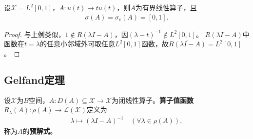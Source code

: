 \documentclass[../../main.tex]{subfiles}%
\begin{document}
\begin{example}
设$\mathscr{X}=L^2[0,1]$，$A:u(t)\mapsto tu(t)$，则$A$为有界线性算子，且
\begin{align*}
\sigma(A)=\sigma_c(A)=[0,1].
\end{align*}
\begin{proof}

与上例类似，$1\notin R(\lambda I-A)$，因$(\lambda-t)^{-1}\notin L^2[0,1]$。
$R(\lambda I-A)$中函数在$t=\lambda$的任意小邻域外可取任意$L^2[0,1]$函数，故$\overline{R(\lambda I-A)}=L^2[0,1]$。

\end{proof}
\end{example}


\subsection{Gelfand定理}

\begin{definition}
设$\mathscr{X}$为$B$空间，$A:D(A)\subseteq\mathscr{X}\to\mathscr{X}$为闭线性算子。\textbf{算子值函数}$R_{\lambda}(A):\rho(A)\to\mathscr{L}(\mathscr{X})$定义为
\begin{align*}
\lambda\mapsto(\lambda I-A)^{-1}\quad(\forall\lambda\in\rho(A)),
\end{align*}
称为$A$的\textbf{预解式}。
\end{definition}
\end{document}
